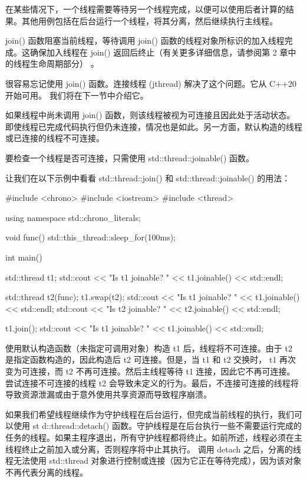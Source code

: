 
在某些情况下，一个线程需要等待另一个线程完成，以便可以使用后者计算的结果。其他用例包括在后台运行一个线程，将其分离，然后继续执行主线程。


join() 函数阻塞当前线程，等待调用 join() 函数的线程对象所标识的加入线程完成。这确保加入线程在 join() 返回后终止（有关更多详细信息，请参阅第 2 章中的线程生命周期部分） 。

很容易忘记使用 join() 函数。连接线程 (jthread) 解决了这个问题。它从 C++20 开始可用。
我们将在下一节中介绍它。


如果线程中尚未调用 join() 函数，则该线程被视为可连接且因此处于活动状态。即使线程已完成代码执行但仍未连接，情况也是如此。另一方面，默认构造的线程或已连接的线程不可连接。

要检查一个线程是否可连接，只需使用 std::thread::joinable() 函数。

让我们在以下示例中看看 std::thread::join() 和 std::thread::joinable() 的用法：

\begin{cpp}
#include <chrono>
#include <iostream>
#include <thread>

using namespace std::chrono_literals;

void func() {
    std::this_thread::sleep_for(100ms);
}

int main() {
    std::thread t1;
    std::cout << "Is t1 joinable? " << t1.joinable()
              << std::endl;

    std::thread t2(func);
    t1.swap(t2);
    std::cout << "Is t1 joinable? " << t1.joinable()
              << std::endl;
    std::cout << "Is t2 joinable? " << t2.joinable()
              << std::endl;

    t1.join();
    std::cout << "Is t1 joinable? " << t1.joinable()
              << std::endl;
}
\end{cpp}

使用默认构造函数（未指定可调用对象）构造 t1 后，线程将不可连接。由于 t2 是指定函数构造的，因此构造后 t2 可连接。但是，当 t1 和 t2 交换时， t1 再次变为可连接，而 t2 不再可连接。然后主线程等待 t1 连接，因此它不再可连接。尝试连接不可连接的线程 t2 会导致未定义的行为。最后，不连接可连接的线程将导致资源泄漏或由于意外使用共享资源而导致程序崩溃。


如果我们希望线程继续作为守护线程在后台运行，但完成当前线程的执行，我们可以使用 st d::thread::detach() 函数。守护线程是在后台执行一些不需要运行完成的任务的线程。如果主程序退出，所有守护线程都将终止。如前所述，线程必须在主线程终止之前加入或分离，否则程序将中止其执行。
调用 detach 之后，分离的线程无法使用 std::thread 对象进行控制或连接（因为它正在等待完成），因为该对象不再代表分离的线程。


